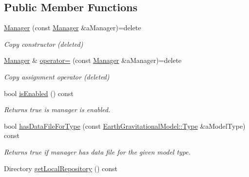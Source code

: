 \subsection*{Public Member Functions}
\begin{DoxyCompactItemize}
\item 
\hyperlink{classlibrary_1_1physics_1_1environment_1_1gravitational_1_1earth_1_1_manager_a15862a738d0bcafd7c0d827e568c74eb}{Manager} (const \hyperlink{classlibrary_1_1physics_1_1environment_1_1gravitational_1_1earth_1_1_manager}{Manager} \&a\+Manager)=delete
\begin{DoxyCompactList}\small\item\em Copy constructor (deleted) \end{DoxyCompactList}\item 
\hyperlink{classlibrary_1_1physics_1_1environment_1_1gravitational_1_1earth_1_1_manager}{Manager} \& \hyperlink{classlibrary_1_1physics_1_1environment_1_1gravitational_1_1earth_1_1_manager_a5c11d0bc12faf4b8761a458583edaa05}{operator=} (const \hyperlink{classlibrary_1_1physics_1_1environment_1_1gravitational_1_1earth_1_1_manager}{Manager} \&a\+Manager)=delete
\begin{DoxyCompactList}\small\item\em Copy assignment operator (deleted) \end{DoxyCompactList}\item 
bool \hyperlink{classlibrary_1_1physics_1_1environment_1_1gravitational_1_1earth_1_1_manager_ab67b0c27b06ae166aae145826df17426}{is\+Enabled} () const
\begin{DoxyCompactList}\small\item\em Returns true is manager is enabled. \end{DoxyCompactList}\item 
bool \hyperlink{classlibrary_1_1physics_1_1environment_1_1gravitational_1_1earth_1_1_manager_a5f20530b2ce9e792f75a90b41a77d36f}{has\+Data\+File\+For\+Type} (const \hyperlink{classlibrary_1_1physics_1_1environment_1_1gravitational_1_1_earth_ab20a2b260831c66ac10f7b9a307d25ca}{Earth\+Gravitational\+Model\+::\+Type} \&a\+Model\+Type) const
\begin{DoxyCompactList}\small\item\em Returns true if manager has data file for the given model type. \end{DoxyCompactList}\item 
Directory \hyperlink{classlibrary_1_1physics_1_1environment_1_1gravitational_1_1earth_1_1_manager_af485913053b7f7f65829a804baadc8b0}{get\+Local\+Repository} () const

\end{DoxyCompactItemize}
